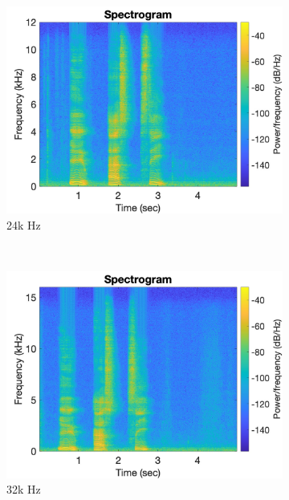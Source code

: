 \documentclass[11pt, oneside]{article}   	%
\begin{document}
\begin{figure}[ht]
\begin{subfigure}[b]{0.3\textwidth}
\includegraphics[width=\textwidth]{imgs/24k-spectrogram.jpg}
\caption{24k Hz}
\end{subfigure}\\
\begin{subfigure}[b]{0.3\textwidth}
\includegraphics[width=\textwidth]{imgs/32k-spectrogram.jpg}
\caption{32k Hz}
\end{subfigure}
\begin{subfigure}[b]{0.3\textwidth}

\end{subfigure}
\end{figure}
\end{document}
